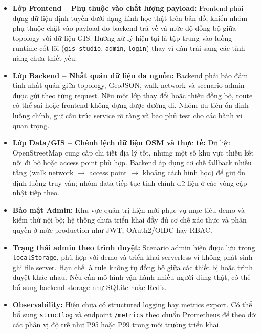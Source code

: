 ﻿\documentclass[../DoAn.tex]{subfiles}
\begin{document}
\begin{itemize}
    \item \textbf{Lớp Frontend -- Phụ thuộc vào chất lượng payload:} Frontend phải dựng dữ liệu định tuyến dưới dạng hình học thật trên bản đồ, khiến nhóm phụ thuộc chặt vào payload do backend trả về và mức độ đồng bộ giữa topology với dữ liệu GIS. Hướng xử lý hiện tại là tập trung vào luồng runtime cốt lõi (\texttt{gis-studio}, \texttt{admin}, \texttt{login}) thay vì dàn trải sang các tính năng chưa thiết yếu.

    \item \textbf{Lớp Backend -- Nhất quán dữ liệu đa nguồn:} Backend phải bảo đảm tính nhất quán giữa topology, GeoJSON, walk network và scenario admin được gửi theo từng request. Nếu một lớp thay đổi hoặc thiếu đồng bộ, route có thể sai hoặc frontend không dựng được đường đi. Nhóm ưu tiên ổn định luồng chính, giữ cấu trúc service rõ ràng và bao phủ test cho các hành vi quan trọng.

    \item \textbf{Lớp Data/GIS -- Chênh lệch dữ liệu OSM và thực tế:} Dữ liệu OpenStreetMap \cite{osm} cung cấp chi tiết địa lý tốt, nhưng một số khu vực thiếu kết nối đi bộ hoặc access point phù hợp. Backend áp dụng cơ chế fallback nhiều tầng (walk network $\to$ access point $\to$ khoảng cách hình học) để giữ ổn định luồng truy vấn; nhóm data tiếp tục tinh chỉnh dữ liệu ở các vòng cập nhật tiếp theo.

    \item \textbf{Bảo mật Admin:} Khu vực quản trị hiện mới phục vụ mục tiêu demo và kiểm thử nội bộ; hệ thống chưa triển khai đầy đủ cơ chế xác thực và phân quyền ở mức production như JWT, OAuth2/OIDC hay RBAC.

    \item \textbf{Trạng thái admin theo trình duyệt:} Scenario admin hiện được lưu trong \texttt{localStorage}, phù hợp với demo và triển khai serverless vì không phát sinh ghi file server. Hạn chế là rule không tự đồng bộ giữa các thiết bị hoặc trình duyệt khác nhau. Nếu cần mô hình vận hành nhiều người dùng thật, có thể bổ sung backend storage như SQLite hoặc Redis.

    \item \textbf{Observability:} Hiện chưa có structured logging hay metrics export. Có thể bổ sung \texttt{structlog} và endpoint \texttt{/metrics} theo chuẩn Prometheus để theo dõi các phân vị độ trễ như P95 hoặc P99 trong môi trường triển khai.
\end{itemize}

\end{document}
